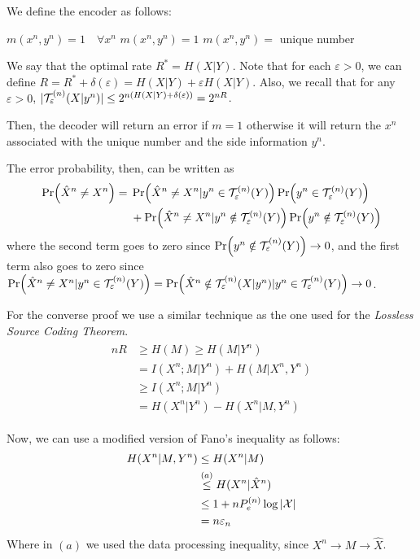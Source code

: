 
We define the encoder as follows:
%
\begin{algorithm}
	{$ m(x^n,y^n) = 1 \quad \forall x^n$}
	{
		{$ m(x^n,y^n) = 1$}
		{$m(x^n,y^n) = $ unique number}
	}
\end{algorithm}

We say that the optimal rate $R^*=H(X|Y)$. Note that for each $\varepsilon>0$, we can define $R = R^* + \delta(\varepsilon) = H(X|Y) + \varepsilon H(X|Y)$. Also, we recall that for any $\varepsilon>0$, $|\mathcal{T}_\varepsilon^{(n)}(X|y^n)| \leq 2^{n(H(X|Y) + \delta(\varepsilon))} = 2^{nR}$.

Then, the decoder will return an error if $m=1$ otherwise it will return the $x^n$ associated with the unique number and the side information $y^n$.

The error probability, then, can be written as
%
\begin{align}
\begin{split}
\Pr(\hat{X}^n \neq X^n) ={}& \Pr(\hat{X}^n \neq X^n|y^n\in \mathcal{T}_\varepsilon^{(n)}(Y))\Pr(y^n\in \mathcal{T}_\varepsilon^{(n)}(Y))\\
&+ \Pr(\hat{X}^n \neq X^n|y^n\notin \mathcal{T}_\varepsilon^{(n)}(Y))\Pr(y^n\notin \mathcal{T}_\varepsilon^{(n)}(Y))
\end{split}
\end{align}
%
where the second term goes to zero since $\Pr(y^n\notin \mathcal{T}_\varepsilon^{(n)}(Y)) \rightarrow 0$, and the first term also goes to zero since $\Pr(\hat{X}^n \neq X^n|y^n\in \mathcal{T}_\varepsilon^{(n)}(Y)) = \Pr(\hat{X}^n \notin \mathcal{T}_\varepsilon^{(n)}(X|y^n) |y^n\in \mathcal{T}_\varepsilon^{(n)}(Y)) \rightarrow 0$.

For the converse proof we use a similar technique as the one used for the \textit{Lossless Source Coding Theorem}.
%
\begin{align}
\begin{split}
nR &\geq H(M) \geq H(M|Y^n)\\
&= I(X^n;M|Y^n) + H(M|X^n,Y^n)\\
&\geq I(X^n;M|Y^n)\\
&= H(X^n|Y^n) - H(X^n|M,Y^n)
\end{split}
\end{align}

Now, we can use a modified version of Fano's inequality as follows:
%
\begin{align}
\begin{split}
H(X^n|M,Y^n) &\leq H(X^n|M)\\
&\stackrel{(a)}{\leq} H(X^n|\hat{X}^n)\\
&\leq 1 + n P_e^{(n)}  \log |\mathcal{X}|\\
&= n \varepsilon_n
\end{split}
\end{align}
Where in $(a)$ we used the data processing inequality, since $X^n \rightarrow M \rightarrow \hat{X}$.

